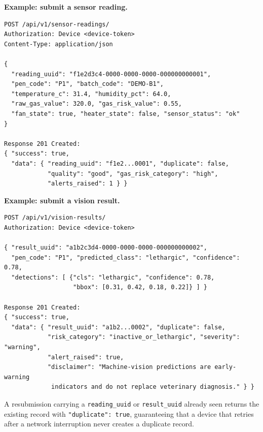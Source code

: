 \documentclass[12pt,a4paper]{report}
\begin{document}
\noindent\textbf{Example: submit a sensor reading.}
\begin{lstlisting}[basicstyle=\scriptsize\ttfamily,breaklines=true,frame=single,columns=fullflexible,xleftmargin=0.3cm]
POST /api/v1/sensor-readings/
Authorization: Device <device-token>
Content-Type: application/json

{
  "reading_uuid": "f1e2d3c4-0000-0000-0000-000000000001",
  "pen_code": "P1", "batch_code": "DEMO-B1",
  "temperature_c": 31.4, "humidity_pct": 64.0,
  "raw_gas_value": 320.0, "gas_risk_value": 0.55,
  "fan_state": true, "heater_state": false, "sensor_status": "ok"
}

Response 201 Created:
{ "success": true,
  "data": { "reading_uuid": "f1e2...0001", "duplicate": false,
            "quality": "good", "gas_risk_category": "high",
            "alerts_raised": 1 } }
\end{lstlisting}

\noindent\textbf{Example: submit a vision result.}
\begin{lstlisting}[basicstyle=\scriptsize\ttfamily,breaklines=true,frame=single,columns=fullflexible,xleftmargin=0.3cm]
POST /api/v1/vision-results/
Authorization: Device <device-token>

{ "result_uuid": "a1b2c3d4-0000-0000-0000-000000000002",
  "pen_code": "P1", "predicted_class": "lethargic", "confidence": 0.78,
  "detections": [ {"cls": "lethargic", "confidence": 0.78,
                   "bbox": [0.31, 0.42, 0.18, 0.22]} ] }

Response 201 Created:
{ "success": true,
  "data": { "result_uuid": "a1b2...0002", "duplicate": false,
            "risk_category": "inactive_or_lethargic", "severity": "warning",
            "alert_raised": true,
            "disclaimer": "Machine-vision predictions are early-warning
             indicators and do not replace veterinary diagnosis." } }
\end{lstlisting}

A resubmission carrying a \texttt{reading\_uuid} or \texttt{result\_uuid} already seen returns the existing record with \texttt{"duplicate": true}, guaranteeing that a device that retries after a network interruption never creates a duplicate record.

\clearpage


\setcounter{table}{0}
\setcounter{figure}{0}
\renewcommand{\thetable}{D.\arabic{table}}
\renewcommand{\thefigure}{D.\arabic{figure}}
\end{document}
